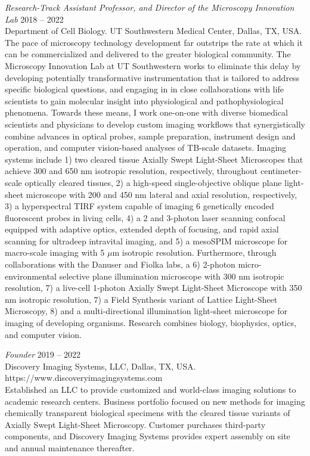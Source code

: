 {\sl Research-Track Assistant Professor, and Director of the Microscopy Innovation Lab} \hfill 2018 -- 2022 \\ 
Department of Cell Biology. 
\newline UT Southwestern Medical Center, Dallas, TX, USA. \hfill \\
\forceindent The pace of microscopy technology development far outstrips the rate at which it can be commercialized and delivered to the greater biological community.  The Microscopy Innovation Lab at UT Southwestern works to eliminate this delay by developing potentially transformative instrumentation that is tailored to address specific biological questions, and engaging in in close collaborations with life scientists to gain molecular insight into physiological and pathophysiological phenomena. Towards these means, I work one-on-one with diverse biomedical scientists and physicians to develop custom imaging workflows that synergistically combine advances in optical probes, sample preparation, instrument design and operation, and computer vision-based analyses of TB-scale datasets. Imaging systems include 1) two cleared tissue Axially Swept Light-Sheet Microscopes that achieve 300 and 650 nm isotropic resolution, respectively, throughout centimeter-scale optically cleared tissues, 2) a high-speed single-objective oblique plane light-sheet microscope with 200 and 450 nm lateral and axial resolution, respectively, 3) a hyperspectral TIRF system capable of imaging 6 genetically encoded fluorescent probes in living cells, 4) a 2 and 3-photon laser scanning confocal equipped with adaptive optics, extended depth of focusing, and rapid axial scanning for ultradeep intravital imaging, and 5) a mesoSPIM microscope for macro-scale imaging with 5 $\mu$m isotropic resolution. Furthermore, through collaborations with the Danuser and Fiolka labs, a 6) 2-photon micro-environmental selective plane illumination microscope with 300 nm isotropic resolution, 7) a live-cell 1-photon Axially Swept Light-Sheet Microscope with 350 nm isotropic resolution, 7) a Field Synthesis variant of Lattice Light-Sheet Microscopy, 8) and a multi-directional illumination light-sheet microscope for imaging of developing organisms. Research combines biology, biophysics, optics, and computer vision.  
\newline

{\sl Founder} \hfill 2019 -- 2022 \\ 
Discovery Imaging Systems, LLC, Dallas, TX, USA. \hfill \\
https://www.discoveryimagingsystems.com \\
\forceindent Established an LLC to provide customized and world-class imaging solutions to academic research centers.  Business portfolio focused on new methods for imaging chemically transparent biological specimens with the cleared tissue variants of Axially Swept Light-Sheet Microscopy.  Customer purchases third-party components, and Discovery Imaging Systems provides expert assembly on site and annual maintenance thereafter.


